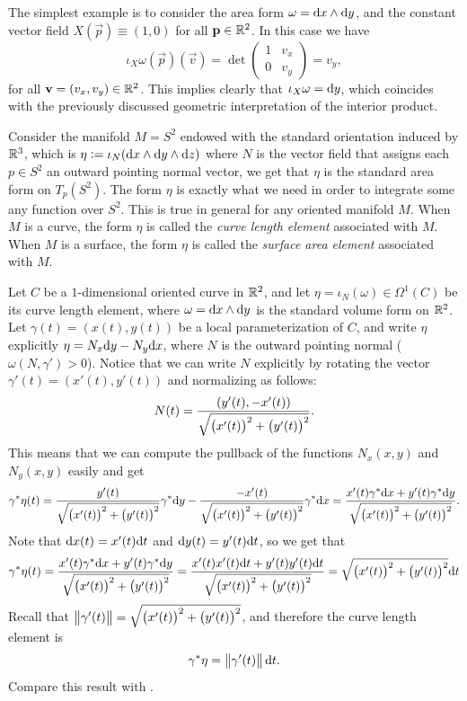 \documentclass[11pt,a4paper]{article}
\begin{document}
\begin{example}
  The simplest example is to consider the area form $\omega = \dx \wedge \dy$,
  and the constant vector field $X(\vec p) \equiv (1,0)$
  for all $\boldsymbol{\mathbf{p}} \in \mathbb{R}^2$.
  In this case we have
  \[
    \iota_X\omega(\vec p)(\vec v) =
    \det
    \begin{pmatrix}
      1 & v_x \\
      0 & v_y
    \end{pmatrix} =
    v_y,
  \]
  for all $\boldsymbol{\mathbf{v}} = (v_x,v_y) \in \mathbb{R}^2$.
  This implies clearly that $\iota_X\omega = \dy$,
  which coincides with the previously discussed geometric interpretation
  of the interior product.
\end{example}

\begin{remark}
  Consider the manifold $M = S^2$
  endowed with the standard orientation induced by $\mathbb{R}^3$,
  which is $\eta := \iota_N(\dx \wedge \dy \wedge \dz)$ where $N$ is the vector
  field that assigns each $p \in S^2$ an outward pointing normal vector,
  we get that $\eta$ is the standard area form on $T_p(S^2)$.
  The form $\eta$ is exactly what we need in order to integrate
  some any function over $S^2$.
  This is true in general for any oriented manifold $M$.
  When $M$ is a curve,
  the form $\eta$ is called the \textit{curve length element}
  associated with $M$.
  When $M$ is a surface,
  the form $\eta$ is called the \textit{surface area element}
  associated with $M$.
\end{remark}

\begin{example}
  Let $C$ be a $1$-dimensional oriented curve in $\mathbb{R}^2$,
  and let $\eta = \iota_N(\omega) \in \Omega^1(C)$ be its curve length element,
  where $\omega = \dx \wedge \dy$ is the standard volume form on $\mathbb{R}^2$.
  Let $\gamma(t) = (x(t),y(t))$ be a local parameterization of $C$,
  and write $\eta$ explicitly $\eta = N_x \dy - N_y \dx$,
  where $N$ is the outward pointing normal ($\omega(N,\gamma') > 0$).
  Notice that we can write $N$ explicitly by rotating the
  vector $\gamma'(t) = (x'(t),y'(t))$ and normalizing as follows:
  \[
    N(t) =
    \frac{(y'(t), -x'(t))}{\sqrt{\del{x'(t)}^2 + \del{y'(t)}^2}}.
  \]
  This means that we can compute the pullback
  of the functions $N_x(x,y)$ and $N_y(x,y)$ easily and get
  \[
    \gamma^*\eta(t) =
    \frac{y'(t)}{\sqrt{\del{x'(t)}^2 + \del{y'(t)}^2}} \gamma^*\dy -
    \frac{-x'(t)}{\sqrt{\del{x'(t)}^2 + \del{y'(t)}^2}} \gamma^*\dx =
    \frac{x'(t) \gamma^*\dx + y'(t) \gamma^*\dy}{\sqrt{\del{x'(t)}^2 + \del{y'(t)}^2}}.
  \]
  Note that $\mathrm{d} x(t) = x'(t) \mathrm{d} t$ and $\mathrm{d} y(t) = y'(t) \mathrm{d} t$,
  so we get that
  \[
    \gamma^*\eta(t) =
    \frac{x'(t) \gamma^*\dx + y'(t) \gamma^*\dy}{\sqrt{\del{x'(t)}^2 + \del{y'(t)}^2}} =
    \frac{x'(t) x'(t) \dt + y'(t) y'(t) \dt}{\sqrt{\del{x'(t)}^2 + \del{y'(t)}^2}} =
    \sqrt{\del{x'(t)}^2 + \del{y'(t)}^2} \dt
  \]
  Recall that $\norm{\gamma'(t)} = \sqrt{\del{x'(t)}^2 + \del{y'(t)}^2}$,
  and therefore the curve length element is
  \[
    \gamma^*\eta = \left\lVert\gamma'(t)\right\rVert \mathrm{d} t.
  \]
  Compare this result with .
\end{example}
\end{document}
